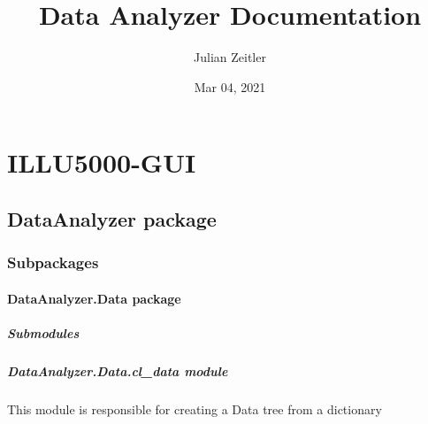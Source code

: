 \documentclass[letterpaper,10pt,english]{sphinxmanual}
\title{Data Analyzer Documentation}
\date{Mar 04, 2021}
\author{Julian Zeitler}
\begin{document}
\pagestyle{empty}
\sphinxmaketitle
\pagestyle{plain}
\sphinxtableofcontents
\pagestyle{normal}
\label{\detokenize{index::doc}}



\chapter{ILLU5000-GUI}
\label{\detokenize{modules:illu5000-gui}}\label{\detokenize{modules::doc}}

\section{DataAnalyzer package}
\label{\detokenize{DataAnalyzer:dataanalyzer-package}}\label{\detokenize{DataAnalyzer::doc}}

\subsection{Subpackages}
\label{\detokenize{DataAnalyzer:subpackages}}

\subsubsection{DataAnalyzer.Data package}
\label{\detokenize{DataAnalyzer.Data:dataanalyzer-data-package}}\label{\detokenize{DataAnalyzer.Data::doc}}

\paragraph{Submodules}
\label{\detokenize{DataAnalyzer.Data:submodules}}

\paragraph{DataAnalyzer.Data.cl\_data module}
\label{\detokenize{DataAnalyzer.Data:module-DataAnalyzer.Data.cl_data}}\label{\detokenize{DataAnalyzer.Data:dataanalyzer-data-cl-data-module}}
This module is responsible for creating a Data tree from a dictionary
\end{document}
